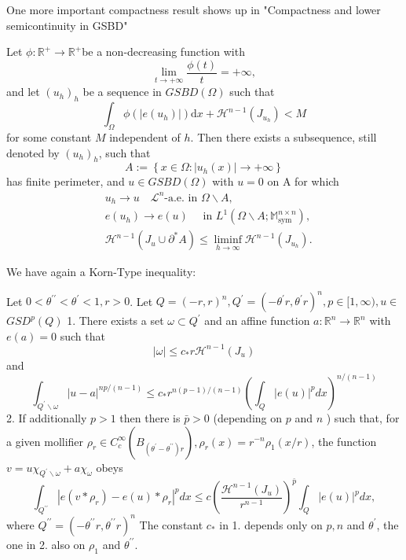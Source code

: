 One more important compactness result shows up in "Compactness and lower semicontinuity in GSBD"

\begin{theorem}
Let \( \phi: \mathbb{R}^{+} \rightarrow \mathbb{R}^{+} \)be a non-decreasing function with
\[
\lim _{t \rightarrow+\infty} \frac{\phi(t)}{t}=+\infty,
\]
and let \( \left(u_h\right)_h \) be a sequence in \( G S B D(\Omega) \) such that
\[
\int_{\Omega} \phi\left(\left|e\left(u_h\right)\right|\right) \mathrm{d} x+\mathcal{H}^{n-1}\left(J_{u_h}\right)<M
\]
for some constant \( M \) independent of \( h \). Then there exists a subsequence, still denoted by \( \left(u_h\right)_h \), such that
\[
A:=\left\{x \in \Omega:\left|u_h(x)\right| \rightarrow+\infty\right\}
\]
has finite perimeter, and \( u \in G S B D(\Omega) \) with \( u=0 \) on A for which
\[
\begin{aligned}
&u_h \rightarrow u \quad \mathcal{L}^n \text {-a.e. in } \Omega \backslash A, \\
&e\left(u_h\right) \rightarrow e(u) \quad \text { in } L^1\left(\Omega \backslash A ; \mathbb{M}_{\text {sym }}^{n \times n}\right), \\
&\mathcal{H}^{n-1}\left(J_u \cup \partial^* A\right) \leq \liminf _{h \rightarrow \infty} \mathcal{H}^{n-1}\left(J_{u_h}\right) .
\end{aligned}
\]
\end{theorem}

We have again a Korn-Type inequality:
\begin{proposition}
 Let $0<\theta^{\prime \prime}<\theta^{\prime}<1, r>0$. Let $Q=(-r, r)^n, Q^{\prime}=\left(-\theta^{\prime} r, \theta^{\prime} r\right)^n, p \in[1, \infty), u \in$ $G S D^p(Q)$
1. There exists a set $\omega \subset Q^{\prime}$ and an affine function $a: \mathbb{R}^n \rightarrow \mathbb{R}^n$ with $e(a)=0$ such that
$$
|\omega| \leq c_* r \mathcal{H}^{n-1}\left(J_u\right)
$$
and
$$
\int_{Q^{\prime} \backslash \omega}|u-a|^{n p /(n-1)} \leq c_* r^{n(p-1) /(n-1)}\left(\int_Q|e(u)|^p d x\right)^{n /(n-1)}
$$
2. If additionally $p>1$ then there is $\bar{p}>0$ (depending on $p$ and $n$ ) such that, for a given mollifier $\rho_r \in C_c^{\infty}\left(B_{\left(\theta^{\prime}-\theta^{\prime \prime}\right) r}\right), \rho_r(x)=r^{-n} \rho_1(x / r)$, the function $v=u \chi_{Q^{\prime} \backslash \omega}+a \chi_\omega$ obeys
$$
\int_{Q^{\prime \prime}}\left|e\left(v * \rho_r\right)-e(u) * \rho_r\right|^p d x \leq c\left(\frac{\mathcal{H}^{n-1}\left(J_u\right)}{r^{n-1}}\right)^{\bar{p}} \int_Q|e(u)|^p d x,
$$
where $Q^{\prime \prime}=\left(-\theta^{\prime \prime} r, \theta^{\prime \prime} r\right)^n$
The constant $c_*$ in 1. depends only on $p, n$ and $\theta^{\prime}$, the one in 2. also on $\rho_1$ and $\theta^{\prime \prime}$.
\end{proposition}

